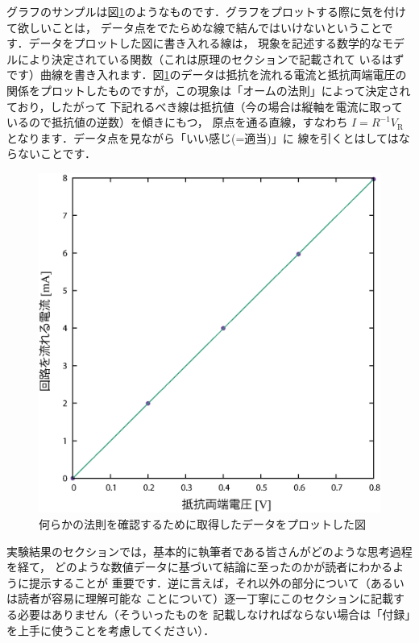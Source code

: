 \documentclass[a4paper,10pt]{jarticle}
\def\rm#1{\mathrm{#1}}
\begin{document}
グラフのサンプルは図\ref{ohm}のようなものです．グラフをプロットする際に気を付けて欲しいことは，
データ点をでたらめな線で結んではいけないということです．データをプロットした図に書き入れる線は，
現象を記述する数学的なモデルにより決定されている関数（これは原理のセクションで記載されて
いるはずです）曲線を書き入れます．図\ref{ohm}のデータは抵抗を流れる電流と抵抗両端電圧の
関係をプロットしたものですが，この現象は「オームの法則」によって決定されており，したがって
下記れるべき線は抵抗値（今の場合は縦軸を電流に取っているので抵抗値の逆数）を傾きにもつ，
原点を通る直線，すなわち $I=R^{-1}V_\rm{R}$ となります．データ点を見ながら「いい感じ(=適当)」に
線を引くとはしてはならないことです．
%
\begin{figure}[ht]
\begin{center}
 \includegraphics[scale=0.4]{ohm22.eps}
 \caption{何らかの法則を確認するために取得したデータをプロットした図}
 \label{ohm}
\end{center}
\end{figure}

実験結果のセクションでは，基本的に執筆者である皆さんがどのような思考過程を経て，
どのような数値データに基づいて結論に至ったのかが読者にわかるように提示することが
重要です．逆に言えば，それ以外の部分について（あるいは読者が容易に理解可能な
ことについて）逐一丁寧にこのセクションに記載する必要はありません（そういったものを
記載しなければならない場合は「付録」を上手に使うことを考慮してください）．
\end{document}
